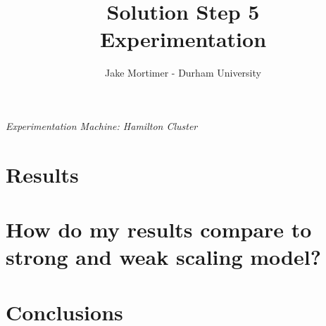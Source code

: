 \documentclass{article}
\title{Solution Step 5 \\ Experimentation}
\author{Jake Mortimer - Durham University}
\begin{document}
\maketitle
\begin{center}\textit{Experimentation Machine: Hamilton Cluster}
\end{center}
\section{Results}

\section{How do my results compare to strong and weak scaling model?}

\section{Conclusions}
\end{document}
